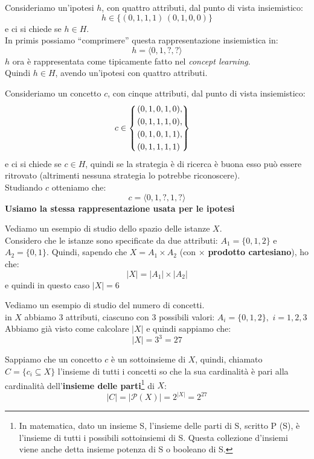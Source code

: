 \begin{esempio}
  Consideriamo un'ipotesi $h$, con quattro attributi, dal punto di vista
  insiemistico: 
  \[h\in\{( 0, 1, 1, 1)\,(0, 1, 0, 0)\}\]
  e ci si chiede se $h\in H$.\\
  In primis possiamo ``comprimere'' questa rappresentazione insiemistica in:
  \[h=\langle 0, 1, ?, ?\rangle\]
  $h$ ora è rappresentata come tipicamente fatto nel \textit{concept
    learning}.\\
  Quindi $h\in H$, avendo un'ipotesi con quattro attributi. 
\end{esempio}
\begin{esempio}
  Consideriamo un concetto $c$, con cinque attributi, dal punto di vista
  insiemistico:
  \[c\in
    \begin{cases}
      \begin{rcases}
        (0, 1, 0, 1, 0),\\
        (0, 1, 1, 1, 0),\\
        (0, 1, 0, 1, 1),\\
        (0, 1, 1, 1, 1)
      \end{rcases}
    \end{cases}
  \]
  e ci si chiede se $c\in H$, quindi se la strategia è di ricerca è buona esso
  può essere ritrovato (altrimenti nessuna strategia lo potrebbe riconoscere).\\
  Studiando $c$ otteniamo che:
  \[c=\langle 0, 1,?, 1,?\rangle\]
  \textbf{Usiamo la stessa rappresentazione usata per le ipotesi}
\end{esempio}
\begin{esempio}
  Vediamo un esempio di studio dello spazio delle istanze $X$.\\
  Considero che le istanze sono specificate da due attributi: $A_1=\{0, 1, 2\}$ e
  $A_2=\{0, 1\}$.
  Quindi, sapendo che $X=A_1\times A_2$ (con $\times$ \textbf{prodotto
    cartesiano}), ho che: 
  \[|X|=|A_1|\times |A_2|\]
  e quindi in questo caso $|X|=6$
\end{esempio}
\begin{esempio}
  Vediamo un esempio di studio del numero di concetti.\\
  in $X$ abbiamo 3 attributi, ciascuno con 3 possibili valori:
  $A_i=\{0, 1, 2\},\,\, i= 1, 2, 3$
  Abbiamo già visto come calcolare $|X|$ e quindi sappiamo che:
  \[|X|=3^3=27\]
  
  Sappiamo che un concetto $c$ è un sottoinsieme di $X$, quindi, chiamato
  $C=\{c_i\subseteq X\}$ l'insieme di tutti i concetti so che la sua cardinalità
  è pari alla cardinalità dell'\textbf{insieme delle parti}\footnote{In matematica, dato un insieme S, l'insieme delle parti di S, scritto P (S), è l'insieme di tutti i possibili sottoinsiemi di S. Questa collezione d'insiemi viene anche detta insieme potenza di S o booleano di S.} di $X$:
  \[|C|=|\mathcal{P}(X)|=2^{|X|}=2^{27}\]
\end{esempio}
